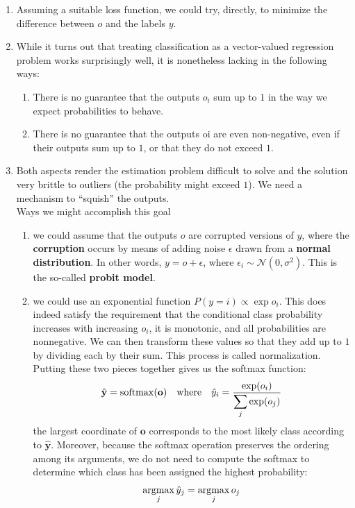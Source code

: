 \begin{enumerate}[itemsep=0.2cm]
    \item Assuming a suitable loss function, we could try, directly, to minimize the difference between $o$ and the labels $y$.

    \item While it turns out that treating classification as a vector-valued regression problem works surprisingly well, it is nonetheless lacking in the following ways:
    \begin{enumerate}
        \item There is no guarantee that the outputs $o_i$ sum up to $1$ in the way we expect probabilities to behave.

        \item There is no guarantee that the outputs oi are even non-negative, even if their outputs sum up to $1$, or that they do not exceed $1$.

    \end{enumerate}

    \item Both aspects render the estimation problem difficult to solve and the solution very brittle to outliers (the probability might exceed $1$). We need a mechanism to “squish” the outputs.\\
    Ways we might accomplish this goal
    \begin{enumerate}[itemsep=0.2cm]

        \item we could assume that the outputs $o$ are corrupted versions of $y$, where the \textbf{corruption} occurs by means of adding noise $\epsilon$ drawn from a \textbf{normal distribution}. In other words, $y = o+\epsilon$, where $\epsilon_i \sim \mathcal{N}(0, \sigma^2)$. This is the so-called \textbf{probit model}.
    
        \item we could use an exponential function $P(y = i) \propto \exp o_i$. This does indeed satisfy the requirement that the conditional class probability increases with increasing $o_i$, it is monotonic, and all probabilities are nonnegative. We can then transform these values so that they add up to $1$ by dividing each by their sum. This process is called normalization. Putting these two pieces together gives us the softmax function:
        \[
            \hfill
            \hat{\mathbf{y}} = \mathrm{softmax}(\mathbf{o}) 
            \quad \textrm{where}\quad 
            \hat{y}_i = \frac{\exp(o_i)}{\dsum_j \exp(o_j)}
            \hfill
        \]
        the largest coordinate of $\mathbf{o}$ corresponds to the most likely class according to $\hat{\mathbf{y}}$. Moreover, because the softmax operation preserves the ordering among its arguments, we do not need to compute the softmax to determine which class has been assigned the highest probability:
        \[
            \hfill
            \operatorname*{argmax}_j \hat y_j = \operatorname*{argmax}_j o_j
            \hfill
        \]

    \end{enumerate}


\end{enumerate}




